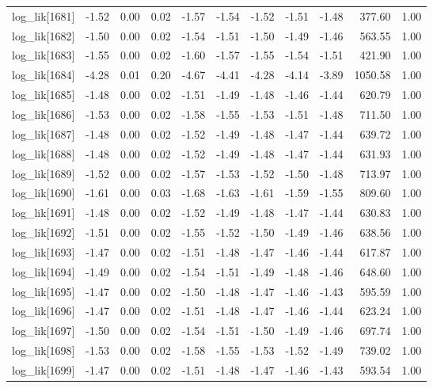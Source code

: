 \begin{table}[ht]
\begin{tabular}{rrrrrrrrrrr}
  log\_lik[1681] & -1.52 & 0.00 & 0.02 & -1.57 & -1.54 & -1.52 & -1.51 & -1.48 & 377.60 & 1.00 \\ 
  log\_lik[1682] & -1.50 & 0.00 & 0.02 & -1.54 & -1.51 & -1.50 & -1.49 & -1.46 & 563.55 & 1.00 \\ 
  log\_lik[1683] & -1.55 & 0.00 & 0.02 & -1.60 & -1.57 & -1.55 & -1.54 & -1.51 & 421.90 & 1.00 \\ 
  log\_lik[1684] & -4.28 & 0.01 & 0.20 & -4.67 & -4.41 & -4.28 & -4.14 & -3.89 & 1050.58 & 1.00 \\ 
  log\_lik[1685] & -1.48 & 0.00 & 0.02 & -1.51 & -1.49 & -1.48 & -1.46 & -1.44 & 620.79 & 1.00 \\ 
  log\_lik[1686] & -1.53 & 0.00 & 0.02 & -1.58 & -1.55 & -1.53 & -1.51 & -1.48 & 711.50 & 1.00 \\ 
  log\_lik[1687] & -1.48 & 0.00 & 0.02 & -1.52 & -1.49 & -1.48 & -1.47 & -1.44 & 639.72 & 1.00 \\ 
  log\_lik[1688] & -1.48 & 0.00 & 0.02 & -1.52 & -1.49 & -1.48 & -1.47 & -1.44 & 631.93 & 1.00 \\ 
  log\_lik[1689] & -1.52 & 0.00 & 0.02 & -1.57 & -1.53 & -1.52 & -1.50 & -1.48 & 713.97 & 1.00 \\ 
  log\_lik[1690] & -1.61 & 0.00 & 0.03 & -1.68 & -1.63 & -1.61 & -1.59 & -1.55 & 809.60 & 1.00 \\ 
  log\_lik[1691] & -1.48 & 0.00 & 0.02 & -1.52 & -1.49 & -1.48 & -1.47 & -1.44 & 630.83 & 1.00 \\ 
  log\_lik[1692] & -1.51 & 0.00 & 0.02 & -1.55 & -1.52 & -1.50 & -1.49 & -1.46 & 638.56 & 1.00 \\ 
  log\_lik[1693] & -1.47 & 0.00 & 0.02 & -1.51 & -1.48 & -1.47 & -1.46 & -1.44 & 617.87 & 1.00 \\ 
  log\_lik[1694] & -1.49 & 0.00 & 0.02 & -1.54 & -1.51 & -1.49 & -1.48 & -1.46 & 648.60 & 1.00 \\ 
  log\_lik[1695] & -1.47 & 0.00 & 0.02 & -1.50 & -1.48 & -1.47 & -1.46 & -1.43 & 595.59 & 1.00 \\ 
  log\_lik[1696] & -1.47 & 0.00 & 0.02 & -1.51 & -1.48 & -1.47 & -1.46 & -1.44 & 623.24 & 1.00 \\ 
  log\_lik[1697] & -1.50 & 0.00 & 0.02 & -1.54 & -1.51 & -1.50 & -1.49 & -1.46 & 697.74 & 1.00 \\ 
  log\_lik[1698] & -1.53 & 0.00 & 0.02 & -1.58 & -1.55 & -1.53 & -1.52 & -1.49 & 739.02 & 1.00 \\ 
  log\_lik[1699] & -1.47 & 0.00 & 0.02 & -1.51 & -1.48 & -1.47 & -1.46 & -1.43 & 593.54 & 1.00 \\ 

\end{tabular}
\end{table}
